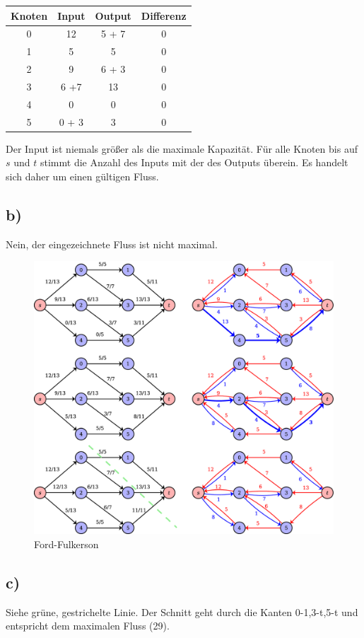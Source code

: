 \documentclass[a4paper,11pt,twoside]{scrartcl}
\begin{document}
\begin{center}
  \begin{tabular}{| c || c | c | c |}
    \hline
    Knoten & Input & Output & Differenz\\ \hline
    0 & 12     & 5 + 7 & 0 \\ \hline
    1 & 5       & 5       & 0 \\ \hline
    2 &  9      & 6 + 3 & 0 \\ \hline
    3 & 6 +7  & 13     & 0 \\ \hline
    4 & 0       & 0       & 0 \\ \hline
    5 & 0 + 3 & 3       & 0 \\ \hline
  \end{tabular}
\end{center}
Der Input ist niemals größer als die maximale Kapazität. Für alle Knoten bis auf $s$ und $t$ stimmt die Anzahl des Inputs mit der des Outputs  überein. Es handelt sich daher um einen gültigen Fluss.
\pagebreak
\subsection*{b)}
Nein, der eingezeichnete Fluss ist nicht maximal.
\begin{figure}[h]
\centering
\includegraphics[width=\linewidth]{Grafik/Diagramm1}
\caption{Ford-Fulkerson}
\label{fig:Ford-Fulkerson}
\end{figure}
\subsection*{c)}
Siehe grüne, gestrichelte Linie. Der Schnitt geht durch die Kanten 0-1,3-t,5-t und entspricht dem maximalen Fluss (29).
\pagebreak
\end{document}

